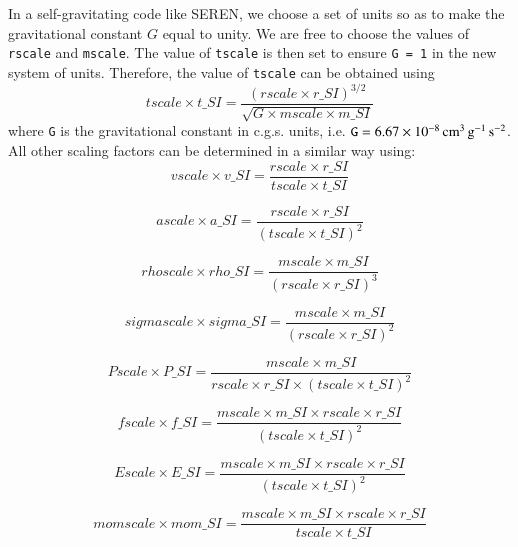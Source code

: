 \documentclass[a4paper]{article}
\newcommand{\var}[1]{\texttt{#1}}
\begin{document}
In a self-gravitating code like SEREN, we choose a set of units so as to make the gravitational constant $G$ equal to unity.   We are free to choose the values of \var{rscale} and \var{mscale}.  The value of \var{tscale} is then set to ensure \var{G = 1} in the new system of units.  Therefore, the value of \var{tscale} can be obtained using 
\begin{equation}
tscale \times t\_SI = \frac{\left( rscale \times r\_SI \right)^{3/2}} 
{\sqrt{G \times mscale \times m\_SI}}
\end{equation}
where \var{G} is the gravitational constant in c.g.s. units, i.e. $\var{G} = 6.67 \times 10^{-8} \, {\rm cm}^3\,{\rm g}^{-1}\,{\rm s}^{-2}$.  All other scaling factors can be determined in a similar way using: 
\begin{equation}
vscale \times v\_SI = \frac{rscale \times r\_SI} {tscale \times t\_SI}
\end{equation}

\begin{equation}
ascale \times a\_SI = \frac{rscale \times r\_SI} {\left(tscale \times t\_SI \right)^2}
\end{equation}

\begin{equation}
rhoscale \times rho\_SI = \frac{mscale \times m\_SI} {\left(rscale \times r\_SI \right)^3}
\end{equation}

\begin{equation}
sigmascale \times sigma\_SI = \frac{mscale \times m\_SI} {\left(rscale \times r\_SI \right)^2}
\end{equation}

\begin{equation}
Pscale \times P\_SI = \frac{mscale \times m\_SI} {rscale \times r\_SI \times \left( tscale \times t\_SI \right)^2}
\end{equation}

\begin{equation}
fscale \times f\_SI = \frac{mscale \times m\_SI \times rscale \times r\_SI} {\left( tscale \times t\_SI \right)^2}
\end{equation}

\begin{equation}
Escale \times E\_SI = \frac{mscale \times m\_SI \times  rscale \times r\_SI} {\left( tscale \times t\_SI \right)^2}
\end{equation}

\begin{equation}
momscale \times mom\_SI = \frac{mscale \times m\_SI \times rscale \times r\_SI} {tscale \times t\_SI}
\end{equation}
\end{document}
